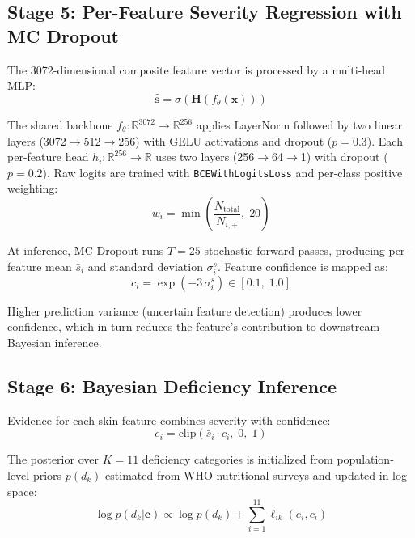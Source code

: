 \documentclass[journal]{IEEEtran}
\begin{document}
\subsection{Stage 5: Per-Feature Severity Regression with MC Dropout}

The 3072-dimensional composite feature vector is processed by a multi-head MLP:
\begin{equation}
\hat{\mathbf{s}} = \sigma\!\left(\mathbf{H}\!\left(f_\theta(\mathbf{x})\right)\right)
\label{eq:mlp}
\end{equation}

The shared backbone $f_\theta: \mathbb{R}^{3072} \to \mathbb{R}^{256}$ applies
LayerNorm followed by two linear layers (3072$\to$512$\to$256) with GELU
activations and dropout ($p=0.3$). Each per-feature head
$h_i: \mathbb{R}^{256} \to \mathbb{R}$ uses two layers (256$\to$64$\to$1) with
dropout ($p=0.2$). Raw logits are trained with \texttt{BCEWithLogitsLoss} and
per-class positive weighting:
\begin{equation}
w_i = \min\!\left(\frac{N_{\text{total}}}{N_{i,+}},\;20\right)
\label{eq:pos_weight}
\end{equation}

At inference, MC Dropout runs $T=25$ stochastic forward passes,
producing per-feature mean $\bar{s}_i$ and standard deviation $\sigma_i^s$.
Feature confidence is mapped as:
\begin{equation}
c_i = \exp(-3\,\sigma_i^s) \in [0.1,\;1.0]
\label{eq:conf}
\end{equation}

Higher prediction variance (uncertain feature detection) produces lower
confidence, which in turn reduces the feature's contribution to downstream
Bayesian inference.

\subsection{Stage 6: Bayesian Deficiency Inference}

Evidence for each skin feature combines severity with confidence:
\begin{equation}
e_i = \text{clip}(\bar{s}_i \cdot c_i,\;0,\;1)
\label{eq:evidence}
\end{equation}

The posterior over $K=11$ deficiency categories is initialized from
population-level priors $p(d_k)$ estimated from WHO nutritional surveys
\cite{who2020} and updated in log space:
\begin{equation}
\log p(d_k|\mathbf{e}) \propto \log p(d_k) + \sum_{i=1}^{11} \ell_{ik}(e_i, c_i)
\label{eq:bayes}
\end{equation}
\end{document}
